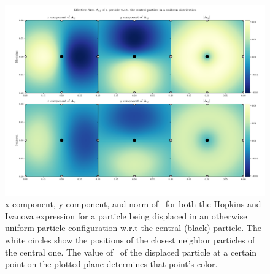 \begin{figure}[htpb]
	\centering
	\includegraphics[width=\textwidth]{figures/Meshless/effective-area-displaced-particle.png}
	\caption{\label{fig:displaced-particle}
		x-component, y-component, and norm of \Aij\ for both the Hopkins and Ivanova expression for
a particle being displaced in an otherwise uniform particle configuration w.r.t the central (black)
particle.
		The white circles show the positions of the closest neighbor particles of the central one.
		The value of \Aij\ of the displaced particle at a certain point on the plotted plane
determines that point's color.
	}
\end{figure}















